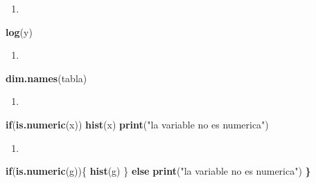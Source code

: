 \documentclass[]{book}
\newenvironment{Shaded}{\begin{snugshade}}{\end{snugshade}}
\newcommand{\ControlFlowTok}[1]{\textcolor[rgb]{0.13,0.29,0.53}{\textbf{#1}}}
\newcommand{\ErrorTok}[1]{\textcolor[rgb]{0.64,0.00,0.00}{\textbf{#1}}}
\newcommand{\KeywordTok}[1]{\textcolor[rgb]{0.13,0.29,0.53}{\textbf{#1}}}
\newcommand{\NormalTok}[1]{#1}
\newcommand{\StringTok}[1]{\textcolor[rgb]{0.31,0.60,0.02}{#1}}
\begin{document}
\begin{enumerate}
\def\labelenumi{\arabic{enumi}.}
\setcounter{enumi}{1}
\item
\end{enumerate}

\begin{Shaded}
\begin{Highlighting}[]
\KeywordTok{log}\NormalTok{(y)}
\end{Highlighting}
\end{Shaded}

\begin{enumerate}
\def\labelenumi{\arabic{enumi}.}
\setcounter{enumi}{2}
\item
\end{enumerate}

\begin{Shaded}
\begin{Highlighting}[]
\KeywordTok{dim.names}\NormalTok{(tabla)}
\end{Highlighting}
\end{Shaded}

\begin{enumerate}
\def\labelenumi{\arabic{enumi}.}
\setcounter{enumi}{3}
\item
\end{enumerate}

\begin{Shaded}
\begin{Highlighting}[]
\ControlFlowTok{if}\NormalTok{(}\KeywordTok{is.numeric}\NormalTok{(x)) }\KeywordTok{hist}\NormalTok{(x) }\KeywordTok{print}\NormalTok{(}\StringTok{"la variable no es numerica"}\NormalTok{)}
\end{Highlighting}
\end{Shaded}

\begin{enumerate}
\def\labelenumi{\arabic{enumi}.}
\setcounter{enumi}{3}
\item
\end{enumerate}

\begin{Shaded}
\begin{Highlighting}[]
\ControlFlowTok{if}\NormalTok{(}\KeywordTok{is.numeric}\NormalTok{(g))\{}
    \KeywordTok{hist}\NormalTok{(g) }
\NormalTok{        \} }\ControlFlowTok{else} 
        \KeywordTok{print}\NormalTok{(}\StringTok{"la variable no es numerica"}\NormalTok{)}
  \ErrorTok{\}}
\end{Highlighting}
\end{Shaded}
\end{document}
